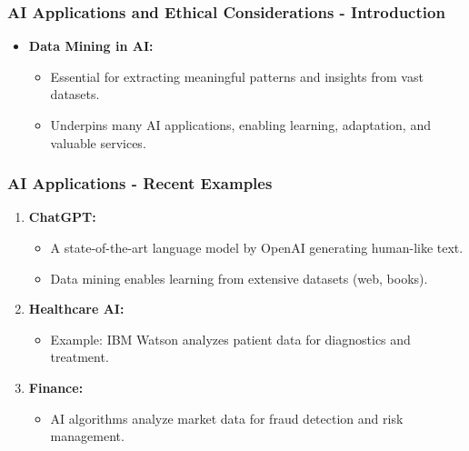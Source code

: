 \documentclass[aspectratio=169]{beamer}
\begin{document}
\begin{frame}[fragile]
    \frametitle{AI Applications and Ethical Considerations - Introduction}
    \begin{itemize}
        \item \textbf{Data Mining in AI:}
        \begin{itemize}
            \item Essential for extracting meaningful patterns and insights from vast datasets.
            \item Underpins many AI applications, enabling learning, adaptation, and valuable services.
        \end{itemize}
    \end{itemize}
\end{frame}

\begin{frame}[fragile]
    \frametitle{AI Applications - Recent Examples}
    \begin{enumerate}
        \item \textbf{ChatGPT:}
        \begin{itemize}
            \item A state-of-the-art language model by OpenAI generating human-like text.
            \item Data mining enables learning from extensive datasets (web, books).
        \end{itemize}
        
        \item \textbf{Healthcare AI:}
        \begin{itemize}
            \item Example: IBM Watson analyzes patient data for diagnostics and treatment.
        \end{itemize}
        
        \item \textbf{Finance:}
        \begin{itemize}
            \item AI algorithms analyze market data for fraud detection and risk management.
        \end{itemize}
    \end{enumerate}
\end{frame}
\end{document}
